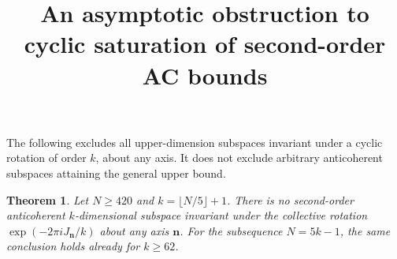 \documentclass[11pt]{article}
\newtheorem{theorem}{Theorem}
\begin{document}
\title{An asymptotic obstruction to cyclic saturation of second-order AC bounds}
\author{}\date{}\maketitle

The following excludes all upper-dimension subspaces invariant under a cyclic
rotation of order $k$, about any axis. It does not exclude arbitrary
anticoherent subspaces attaining the general upper bound.

\begin{theorem}
Let $N\ge420$ and $k=\lfloor N/5\rfloor+1$. There is no second-order
anticoherent $k$-dimensional subspace invariant under the collective rotation
$\exp(-2\pi i J_{\mathbf n}/k)$ about any axis $\mathbf n$.
For the subsequence $N=5k-1$, the same conclusion holds already for $k\ge62$.
\end{theorem}
\end{document}
